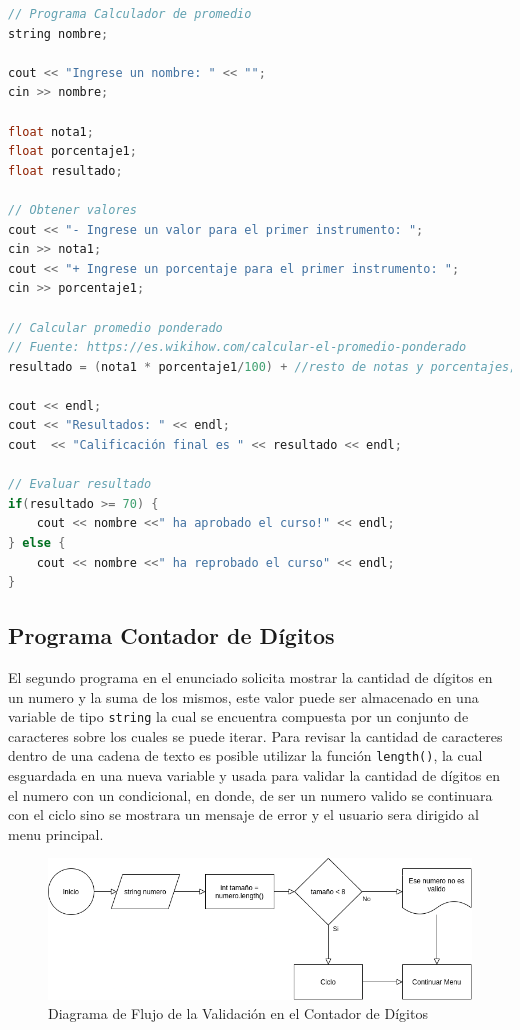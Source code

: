 \documentclass[12pt]{article}
\begin{document}
\begin{lstlisting}[language=c++]
// Programa Calculador de promedio
string nombre;

cout << "Ingrese un nombre: " << "";
cin >> nombre;

float nota1;
float porcentaje1;
float resultado;

// Obtener valores
cout << "- Ingrese un valor para el primer instrumento: ";
cin >> nota1;
cout << "+ Ingrese un porcentaje para el primer instrumento: ";
cin >> porcentaje1;

// Calcular promedio ponderado
// Fuente: https://es.wikihow.com/calcular-el-promedio-ponderado
resultado = (nota1 * porcentaje1/100) + //resto de notas y porcentajes;

cout << endl;
cout << "Resultados: " << endl;
cout  << "Calificación final es " << resultado << endl;

// Evaluar resultado
if(resultado >= 70) {
    cout << nombre <<" ha aprobado el curso!" << endl;
} else {
    cout << nombre <<" ha reprobado el curso" << endl;
}
\end{lstlisting}

\pagebreak

\subsection{Programa Contador de Dígitos}

El segundo programa en el enunciado solicita mostrar la cantidad de dígitos en un numero y la suma de los mismos, este valor puede ser almacenado en una variable de tipo \verb+string+ la cual se encuentra compuesta por un conjunto de caracteres sobre los cuales se puede iterar. Para revisar la cantidad de caracteres dentro de una cadena de texto es posible utilizar la función \verb+length()+, la cual esguardada en una nueva variable y usada para validar la cantidad de dígitos en el numero con un condicional, en donde, de ser un numero valido se continuara con el ciclo sino se mostrara un mensaje de error y el usuario sera dirigido al menu principal.

\begin{figure}[H]
    \caption{Diagrama de Flujo de la Validación en el Contador de Dígitos}
    \centering
    \includegraphics[scale=0.6]{programa2_validacion.png}
\end{figure}
\end{document}
